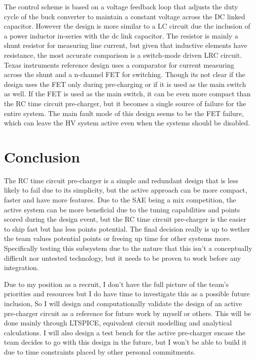 \documentclass{article}
\begin{document}
\vspace{0.5cm}
The control scheme is based on a voltage feedback loop that adjusts the duty cycle of the buck converter to maintain a constant voltage across the DC linked capacitor. However the design
is more similar to a LC circuit due the inclusion of a power inductor in-series with the dc link capacitor. The resistor is mainly a shunt resistor for measuring line current, but given
that inductive elements have resistance, the most accurate comparison is a switch-mode driven LRC circuit. Texas instruments reference design uses a comparator for current measuring 
across the shunt and a n-channel FET for switching. Though its not clear if the design uses the FET only during pre-charging or if it is used as the main switch as well. If the FET is used
as the main switch, it can be even more compact than the RC time circuit pre-charger, but it becomes a single source of failure for the entire system. The main fault mode of this design seems
to be the FET failure, which can leave the HV system active even when the systems should be disabled.


\section{Conclusion}
The RC time circuit pre-charger is a simple and redundant design that is less likely to fail due to its simplicity, but the active approach can be more compact, faster and have more features.
Due to the SAE being a mix competition, the active system can be more beneficial due to the tuning capabilities and points scored during the design event, but the RC time circuit pre-charger
is the easier to ship fast but has less points potential. The final decision really is up to wether the team values potential points or freeing up time for other systems more. Specifically
testing this subsystem due to the nature that this isn't a conceptually difficult nor untested technology, but it needs to be proven to work before any integration.

\vspace{0.5cm}
Due to my position as a recruit, I don't have the full picture of the team's priorities and resources but I do have time to investigate this as a possible future inclusion, So I will design and 
computationally validate the design of an active pre-charger circuit as a reference for future work by myself or others. This will be done mainly through LTSPICE, equivalent circuit modelling
and analytical calculations. I will also design a test bench for the active pre-charger encase the team decides to go with this design in the future, but I won't be able to build it due to time 
constraints placed by other personal commitments. 
\end{document}
